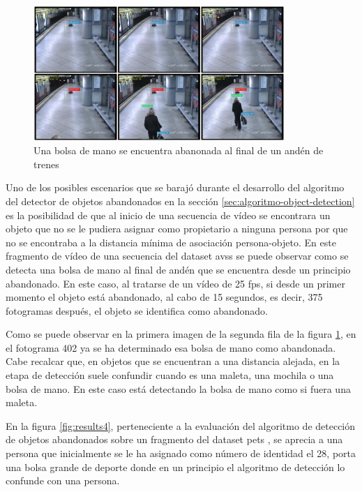 \begin{figure}[ht]
\centering
\includegraphics[width=0.85\textwidth]{img/chapters/resultados/abandono/3.png}
\caption{\label{fig:results3}Una bolsa de mano se encuentra abanonada al final de un andén de trenes \cite{AVSSAB2007-dataset}}
\end{figure}

Uno de los posibles escenarios que se barajó durante el desarrollo del algoritmo del detector de objetos abandonados en la sección \ref{sec:algoritmo-object-detection} es la posibilidad de que al inicio de una secuencia de vídeo se encontrara un objeto que no se le pudiera asignar como propietario a ninguna persona por que no se encontraba a la distancia mínima de asociación persona-objeto. En este fragmento de vídeo de una secuencia del dataset \gls{avss} \cite{AVSSAB2007-dataset} se puede observar como se detecta una bolsa de mano al final de andén que se encuentra desde un principio abandonado. En este caso, al tratarse de un vídeo de 25 \gls{fps}, si desde un primer momento el objeto está abandonado, al cabo de 15 segundos, es decir, 375 fotogramas después, el objeto se identifica como abandonado.

Como se puede observar en la primera imagen de la segunda fila de la figura \ref{fig:results3}, en el fotograma 402 ya se ha determinado esa bolsa de mano como abandonada. Cabe recalcar que, en objetos que se encuentran a una distancia alejada, en la etapa de detección suele confundir cuando es una maleta, una mochila o una bolsa de mano. En este caso está detectando la bolsa de mano como si fuera una maleta. 

En la figura \ref{fig:results4}, perteneciente a la evaluación del algoritmo de detección de objetos abandonados sobre un fragmento del dataset \gls{pets} \cite{pets2007-dataset}, se aprecia a una persona que inicialmente se le ha asignado como número de identidad el 28, porta una bolsa grande de deporte donde en un principio el algoritmo de detección lo confunde con una persona.

